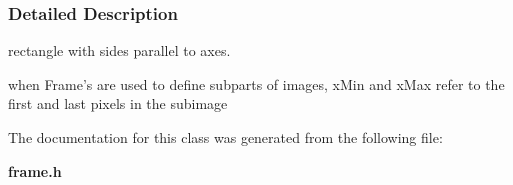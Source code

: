 \subsubsection{Detailed Description}
rectangle with sides parallel to axes.

when Frame's are used to define subparts of images, x\-Min and x\-Max refer to the first and last pixels in the subimage 



The documentation for this class was generated from the following file:\begin{CompactItemize}
\item 
{\bf frame.h}\end{CompactItemize}
